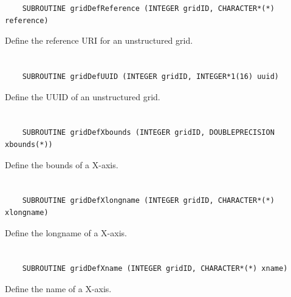\begin{verbatim}
    SUBROUTINE gridDefReference (INTEGER gridID, CHARACTER*(*) reference)
\end{verbatim}

Define the reference URI for an unstructured grid.


\section*{\tt {}}

\begin{verbatim}
    SUBROUTINE gridDefUUID (INTEGER gridID, INTEGER*1(16) uuid)
\end{verbatim}

Define the UUID of an unstructured grid.


\section*{\tt {}}

\begin{verbatim}
    SUBROUTINE gridDefXbounds (INTEGER gridID, DOUBLEPRECISION xbounds(*))
\end{verbatim}

Define the bounds of a X-axis.


\section*{\tt {}}

\begin{verbatim}
    SUBROUTINE gridDefXlongname (INTEGER gridID, CHARACTER*(*) xlongname)
\end{verbatim}

Define the longname of a X-axis.


\section*{\tt {}}

\begin{verbatim}
    SUBROUTINE gridDefXname (INTEGER gridID, CHARACTER*(*) xname)
\end{verbatim}

Define the name of a X-axis.


\section*{\tt {}}

